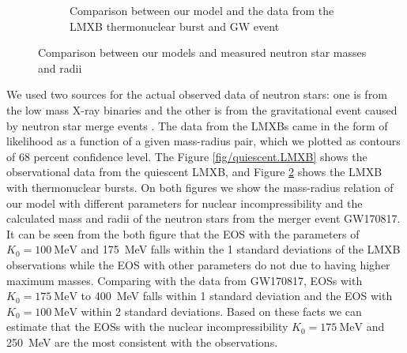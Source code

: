 \documentclass[draft,11pt]{article}
\theoremstyle{definition}
\theoremstyle{remark}
\begin{document}
\begin{figure}[h]
\begin{center}
\begin{subfigure}[b]{.49\textwidth}
                    \caption{Comparison between our model and the data from the LMXB thermonuclear burst and GW event}\label{fig/burst.LMXB}
                \end{subfigure}
                \caption{Comparison between our models and measured neutron star masses and radii}
            \end{center}\end{figure}
            
                We used two sources for the actual observed data of neutron stars: one is from the low mass X-ray binaries \parencite{ozel.psaltis.2016/radius.oberve} and the other is from the gravitational event caused by neutron star merge events \cite{ligo.virgo.2019/prop.of.ns.merger.GW170817,ligo.virgo.2018/GW170817.ns.radii}. The data from the LMXBs came in the form of likelihood as a function of a given mass-radius pair, which we plotted as contours of 68 percent confidence level. The Figure \ref{fig/quiescent.LMXB} shows the observational data from the quiescent LMXB, and Figure \ref{fig/burst.LMXB} shows the LMXB with thermonuclear bursts. On both figures we show the mass-radius relation of our model with different parameters for nuclear incompressibility and the calculated mass and radii of the neutron stars from the merger event GW170817. It can be seen from the both figure that the EOS with the parameters of $K_{0}=\SI{100}{\mega\electronvolt}$ and \SI{175}{\mega\electronvolt} falls within the 1 standard deviations of the LMXB observations while the EOS with other parameters do not due to having higher maximum masses. Comparing with the data from GW170817, EOSs with $K_{0}=\SI{175}{\mega\electronvolt}$ to \SI{400}{\mega\electronvolt} falls within 1 standard deviation and the EOS with $K_{0}=\SI{100}{\mega\electronvolt}$ within 2 standard deviations. Based on these facts we can estimate that the EOSs with the nuclear incompressibility $K_{0}=\SI{175}{\mega\electronvolt}$ and \SI{250}{\mega\electronvolt} are the most consistent with the observations.
    
\end{document}
